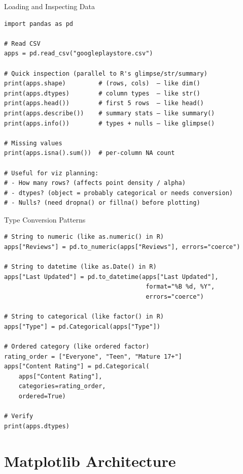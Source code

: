 \documentclass[10pt]{beamer}
\begin{document}
\begin{frame}[fragile]{Loading and Inspecting Data}
\begin{lstlisting}[style=pythonstyle]
import pandas as pd

# Read CSV
apps = pd.read_csv("googleplaystore.csv")

# Quick inspection (parallel to R's glimpse/str/summary)
print(apps.shape)         # (rows, cols)  — like dim()
print(apps.dtypes)        # column types  — like str()
print(apps.head())        # first 5 rows  — like head()
print(apps.describe())    # summary stats — like summary()
print(apps.info())        # types + nulls — like glimpse()

# Missing values
print(apps.isna().sum())  # per-column NA count

# Useful for viz planning:
# - How many rows? (affects point density / alpha)
# - dtypes? (object = probably categorical or needs conversion)
# - Nulls? (need dropna() or fillna() before plotting)
\end{lstlisting}
\end{frame}

\begin{frame}[fragile]{Type Conversion Patterns}
\begin{lstlisting}[style=pythonstyle]
# String to numeric (like as.numeric() in R)
apps["Reviews"] = pd.to_numeric(apps["Reviews"], errors="coerce")

# String to datetime (like as.Date() in R)
apps["Last Updated"] = pd.to_datetime(apps["Last Updated"],
                                       format="%B %d, %Y",
                                       errors="coerce")

# String to categorical (like factor() in R)
apps["Type"] = pd.Categorical(apps["Type"])

# Ordered category (like ordered factor)
rating_order = ["Everyone", "Teen", "Mature 17+"]
apps["Content Rating"] = pd.Categorical(
    apps["Content Rating"],
    categories=rating_order,
    ordered=True)

# Verify
print(apps.dtypes)
\end{lstlisting}
\end{frame}

\section{Matplotlib Architecture}
\end{document}
